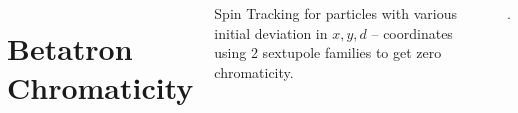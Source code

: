 \documentclass[25pt, a0paper, portrait, blockverticalspace=.5cm]{tikzposter}
\begin{document}
\begin{columns}
{\begin{minipage}{0.3\linewidth}
		 	\section*{Betatron Chromaticity}
			\par Spin Tracking for particles with various initial deviation in $x, y, d$ – coordinates using 2 sextupole families 					to get zero chromaticity.
		\end{minipage}
		\begin{minipage}{0.05\linewidth}
		\par  $.$
		\end{minipage}
		\begin{minipage}{0.3\linewidth}

\end{minipage}}
\end{columns}
\end{document}
